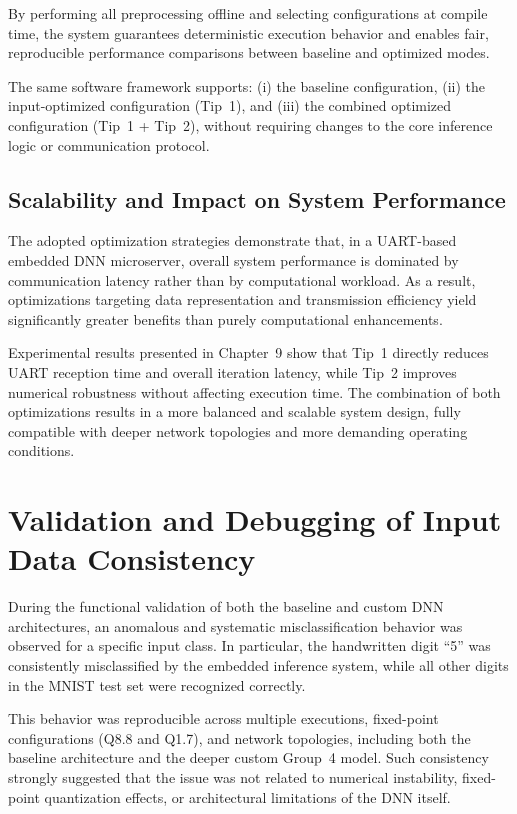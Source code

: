 By performing all preprocessing offline and selecting configurations at compile
time, the system guarantees deterministic execution behavior and enables fair,
reproducible performance comparisons between baseline and optimized modes.

The same software framework supports:
(i) the baseline configuration,
(ii) the input-optimized configuration (Tip~1),
and (iii) the combined optimized configuration (Tip~1 + Tip~2),
without requiring changes to the core inference logic or communication protocol.

\section{Scalability and Impact on System Performance}

The adopted optimization strategies demonstrate that, in a UART-based embedded
DNN microserver, overall system performance is dominated by communication latency
rather than by computational workload.
As a result, optimizations targeting data representation and transmission
efficiency yield significantly greater benefits than purely computational
enhancements.

Experimental results presented in Chapter~9 show that Tip~1 directly reduces UART
reception time and overall iteration latency, while Tip~2 improves numerical
robustness without affecting execution time.
The combination of both optimizations results in a more balanced and scalable
system design, fully compatible with deeper network topologies and more demanding
operating conditions.



\chapter{Validation and Debugging of Input Data Consistency}

During the functional validation of both the baseline and custom DNN architectures,
an anomalous and systematic misclassification behavior was observed for a specific
input class.
In particular, the handwritten digit ``5'' was consistently misclassified by the
embedded inference system, while all other digits in the MNIST test set were
recognized correctly.

This behavior was reproducible across multiple executions, fixed-point
configurations (Q8.8 and Q1.7), and network topologies, including both the baseline
architecture and the deeper custom Group~4 model.
Such consistency strongly suggested that the issue was not related to numerical
instability, fixed-point quantization effects, or architectural limitations of the
DNN itself.

